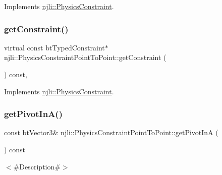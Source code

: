 Implements \mbox{\hyperlink{classnjli_1_1_physics_constraint_a0a22d54c2c896af49fa57db9be76a5da}{njli\+::\+Physics\+Constraint}}.

\mbox{\label{classnjli_1_1_physics_constraint_point_to_point_a2ee05517ec402655c0953184dc7642b3}} 
\subsubsection{\texorpdfstring{get\+Constraint()}{getConstraint()}\hspace{0.1cm}{\footnotesize\ttfamily [2/2]}}
{\footnotesize\ttfamily virtual const bt\+Typed\+Constraint$\ast$ njli\+::\+Physics\+Constraint\+Point\+To\+Point\+::get\+Constraint (\begin{DoxyParamCaption}{ }\end{DoxyParamCaption}) const\hspace{0.3cm}{\ttfamily [protected]}, {\ttfamily [virtual]}}



Implements \mbox{\hyperlink{classnjli_1_1_physics_constraint_af4cb8c0158a044f75fe61f89cc278338}{njli\+::\+Physics\+Constraint}}.

\mbox{\label{classnjli_1_1_physics_constraint_point_to_point_a0081daad53ef60302f884626e1da987b}} 
\subsubsection{\texorpdfstring{get\+Pivot\+In\+A()}{getPivotInA()}}
{\footnotesize\ttfamily const bt\+Vector3\& njli\+::\+Physics\+Constraint\+Point\+To\+Point\+::get\+Pivot\+InA (\begin{DoxyParamCaption}{ }\end{DoxyParamCaption}) const}

$<$\#\+Description\#$>$

